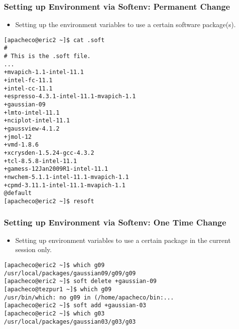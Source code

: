 \documentclass[slidestop,mathserif,compress,xcolor=svgnames,table]{beamer}
\begin{document}
\begin{frame}[fragile]
\frametitle{\small Setting up Environment via Softenv: Permanent Change}
\begin{itemize}
\item Setting up the environment variables to use a certain software package(s).
\end{itemize}
{\tiny
\begin{alertblock}{}
\begin{verbatim}
[apacheco@eric2 ~]$ cat .soft
#   
# This is the .soft file.
...
+mvapich-1.1-intel-11.1
+intel-fc-11.1
+intel-cc-11.1
+espresso-4.3.1-intel-11.1-mvapich-1.1
+gaussian-09
+lmto-intel-11.1
+nciplot-intel-11.1
+gaussview-4.1.2
+jmol-12
+vmd-1.8.6
+xcrysden-1.5.24-gcc-4.3.2
+tcl-8.5.8-intel-11.1
+gamess-12Jan2009R1-intel-11.1
+nwchem-5.1.1-intel-11.1-mvapich-1.1
+cpmd-3.11.1-intel-11.1-mvapich-1.1
@default
[apacheco@eric2 ~]$ resoft
\end{verbatim}
\end{alertblock}
}
\end{frame}

\begin{frame}[fragile]
\frametitle{\small Setting up Environment via Softenv: One Time Change}
\begin{itemize}
\item Setting up environment variables to use a certain package in the current session only.
\end{itemize}
{\tiny
\begin{alertblock}{}
\begin{verbatim}
[apacheco@eric2 ~]$ which g09
/usr/local/packages/gaussian09/g09/g09
[apacheco@eric2 ~]$ soft delete +gaussian-09
[apacheco@tezpur1 ~]$ which g09
/usr/bin/which: no g09 in (/home/apacheco/bin:...
[apacheco@eric2 ~]$ soft add +gaussian-03
[apacheco@eric2 ~]$ which g03
/usr/local/packages/gaussian03/g03/g03
\end{verbatim}
\end{alertblock}
}
\end{frame}
\end{document}

